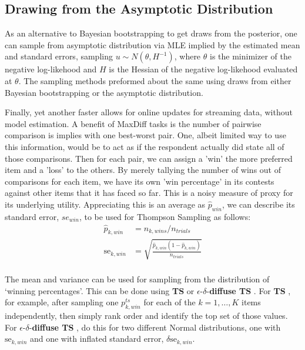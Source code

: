 \documentclass[nonblindrev]{informs3}
\newcommand{\ts}{\textbf{TS} }
\newcommand{\edts}{$\epsilon$-$\delta$-\textbf{diffuse TS} }
\begin{document}
\subsection{Drawing from the Asymptotic Distribution}
As an alternative to Bayesian bootstrapping to get draws from the posterior, one can sample from asymptotic distribution via MLE implied by the estimated mean and standard errors, sampling $u \sim N(\theta,H^{-1})$, where $\theta$ is the minimizer of the negative log-likehood and $H$ is the Hessian of the negative log-likehood evaluated at $\theta$. The sampling methods preformed about the same using draws from either Bayesian bootstrapping or the asymptotic distribution.

Finally, yet another faster allows for online updates for streaming data, without model estimation. A benefit of MaxDiff tasks is the number of pairwise comparison is implies with one best-worst pair. One, albeit limited way to use this information, would be to act as if the respondent actually did state all of those comparisons. Then for each pair, we can assign a 'win' the more preferred item and a 'loss' to the others. By merely tallying the number of wins out of comparisons for each item, we have its own 'win percentage' in its contests against other items that it has faced so far. This is a noisy measure of proxy for its underlying utility. Appreciating this is an average as $\hat{p}_{win}$, we can describe its standard error, $se_{win}$, to be used for Thompson Sampling as follows:
\begin{align}
\hat{p}_{k,win} &= n_{k,wins} / n_{trials} \\
\text{se}_{k,win} &= \sqrt{  \frac{ \hat{p}_{k,win} (1-\hat{p}_{k,win}) } {n_{trials}}  } \\
\end{align}

The mean and variance can be used for sampling from the distribution of `winning percentages'. This can be done using \ts or \edts. For \ts, for example, after sampling one $p_{k,win}^{ts}$ for each of the $k=1,\ldots,K$ items independently, then simply rank order and identify the top set of those values. For \edts, do this for two different Normal distributions, one with $\text{se}_{k,win}$ and one with inflated standard error, $\delta \text{se}_{k,win}$.
\end{document}
